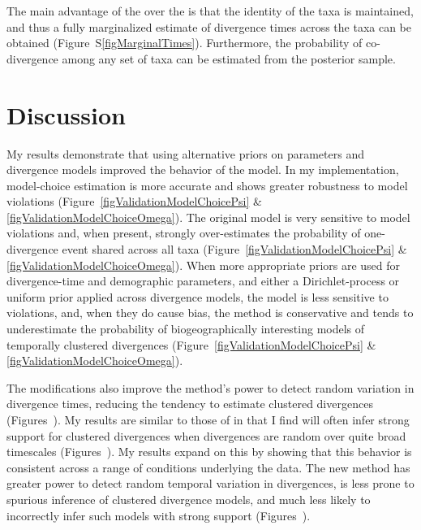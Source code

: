 The main advantage of the \npModelDPPOrdered over the \npModelDPP is that the
identity of the taxa is maintained, and thus a fully marginalized estimate of
divergence times across the taxa can be obtained
(Figure~S\ref{figMarginalTimes}).
Furthermore, the probability of co-divergence among any set of taxa can be
estimated from the posterior sample.

\section{Discussion}
My results demonstrate that using alternative priors on parameters and
divergence models improved the behavior of the \msb model.
In my implementation, model-choice estimation is more accurate and shows
greater robustness to model violations
(Figure~\ref{figValidationModelChoicePsi} \&
\ref{figValidationModelChoiceOmega}).
The original model is very sensitive to model violations and, when present,
strongly over-estimates the probability of one-divergence event shared
across all taxa
(Figure~\ref{figValidationModelChoicePsi} \&
\ref{figValidationModelChoiceOmega}).
When more appropriate priors are used for divergence-time and demographic
parameters, and either a Dirichlet-process or uniform prior applied across
divergence models, the model is less sensitive to violations, and, when they do
cause bias, the method is conservative and tends to underestimate the
probability of biogeographically interesting models of temporally clustered
divergences (Figure~\ref{figValidationModelChoicePsi} \&
\ref{figValidationModelChoiceOmega}).

The modifications also improve the method's power to detect random
variation in divergence times, reducing the tendency to estimate clustered
divergences
(Figures~).
My results are similar to those of \citet{Oaks2012} in that I find
\msb will often infer strong support for clustered divergences when
divergences are random over quite broad timescales
(Figures~).
My results expand on this by showing that this behavior is consistent
across a range of conditions underlying the data.
The new method \dppmsbayes has greater power to detect random temporal variation in
divergences, is less prone to spurious inference of clustered divergence
models, and much less likely to incorrectly infer such models with strong
support
(Figures~).

